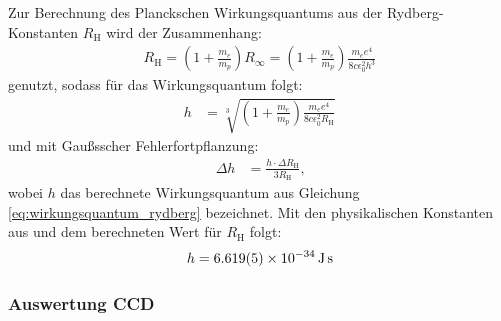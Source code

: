 \documentclass[11pt, a4paper]{article}
\numberwithin{equation}{section}
\begin{document}
Zur Berechnung des Planckschen Wirkungsquantums aus der Rydberg-Konstanten $R_\mathrm{H}$ wird der Zusammenhang:
\begin{align*}
	R_\mathrm{H} = \left( 1 + \frac{m_e}{m_p} \right) R_\infty = \left( 1 + \frac{m_e}{m_p} \right) \frac{m_e e^4}{8 c \epsilon_0^2 h^3}
\end{align*}
genutzt, sodass für das Wirkungsquantum folgt:
\begin{align}
	\label{eq:wirkungsquantum_rydberg}
	h &= \sqrt[3]{\left( 1 + \frac{m_e}{m_p} \right) \frac{m_e e^4}{8 c \epsilon_0^2 R_\mathrm{H}}}
\end{align}
und mit Gaußsscher Fehlerfortpflanzung:
\begin{align*}
	\Delta h &= \frac{h \cdot \Delta R_\mathrm{H}}{3 R_\mathrm{H}} \text{,}
\end{align*}
wobei $h$ das berechnete Wirkungsquantum aus Gleichung \ref{eq:wirkungsquantum_rydberg} bezeichnet.
Mit den physikalischen Konstanten aus \cite{CODATA} und dem berechneten Wert für $R_\mathrm{H}$ folgt:
\begin{align*}
	h = \SI{6.619 +- 0.005e-34}{\joule\second}
\end{align*}

\subsubsection{Auswertung CCD}
\end{document}
